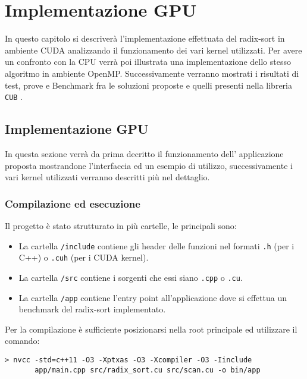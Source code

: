 \setchapterpreamble[u]{\margintoc}
\chapter{Implementazione GPU}

\begin{chap-intro}
	In questo capitolo si descriverà l'implementazione effettuata del radix-sort in ambiente CUDA analizzando il funzionamento dei vari kernel utilizzati. Per avere un confronto con la CPU verrà poi illustrata una implementazione dello stesso algoritmo in ambiente OpenMP. Successivamente verranno mostrati i risultati di test, prove e Benchmark fra le soluzioni proposte e quelli presenti nella libreria \texttt{CUB} \cite{CUB}.
\end{chap-intro}


\section{Implementazione GPU}
In questa sezione verrà da prima decritto il funzionamento dell' applicazione proposta mostrandone l'interfaccia ed un esempio di utilizzo, successivamente i vari kernel utilizzati verranno descritti più nel dettaglio.

\subsection{Compilazione ed esecuzione}
Il progetto è stato strutturato in più cartelle, le principali sono:
\begin{itemize}
\item La cartella \texttt{/include} contiene gli header delle funzioni nel formati \texttt{.h} (per i C++) o \texttt{.cuh} (per i CUDA kernel).
\item La cartella \texttt{/src} contiene i sorgenti che essi siano \texttt{.cpp} o \texttt{.cu}.
\item La cartella \texttt{/app} contiene l'entry point all'applicazione dove si effettua un benchmark del radix-sort implementato.
\end{itemize}

Per la compilazione è sufficiente posizionarsi nella root principale ed utilizzare il comando:

\begin{lstlisting}[style=console, caption={Comando per compilare il progetto. L'eseguibile prodotto è chiamato \texttt{app} e posizionato nella sotto-cartella \texttt{/bin}.}, label={compile-command}]
> nvcc -std=c++11 -O3 -Xptxas -O3 -Xcompiler -O3 -Iinclude 
       app/main.cpp src/radix_sort.cu src/scan.cu -o bin/app 
\end{lstlisting}

